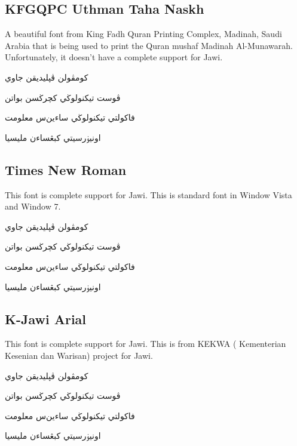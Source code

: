 \documentclass[12pt,a4paper]{IEEEconf}
\begin{document}
\subsection{KFGQPC Uthman Taha Naskh}

A beautiful font from King Fadh Quran Printing Complex, Madinah, Saudi Arabia that is being used to print the Quran mushaf Madinah Al-Munawarah. Unfortunately, it doesn't have a complete support for Jawi.

\newfontfamily{}
\begin{arab}
\begin{center}
کومڤولن ڤڽليديقن جاوي
\par  
ڤوست تيكنولوڬي کچرڬسن بواتن
\par  
فاکولتي تيكنولوڬي ساءين‌س معلومت
\par  
اونيۏرسيتي کبڠساءن مليسيا
\par  
\end{center}
\end{arab}

\subsection{Times New Roman}
This font is complete support for Jawi. This is standard font in Window Vista and Window 7.
\newfontfamily{}

\begin{arab}
\begin{center}
کومڤولن ڤڽليديقن جاوي
\par  
ڤوست تيكنولوڬي کچرڬسن بواتن
\par  
فاکولتي تيكنولوڬي ساءين‌س معلومت
\par  
اونيۏرسيتي کبڠساءن مليسيا
\par  
\end{center}
\end{arab}

\subsection{K-Jawi Arial}
This font is complete support for Jawi. This is from KEKWA ( Kementerian Kesenian dan Warisan) project for Jawi.

\newfontfamily{}

\begin{arab}
\begin{center}
کومڤولن ڤڽليديقن جاوي
\par  
ڤوست تيكنولوڬي کچرڬسن بواتن
\par  
فاکولتي تيكنولوڬي ساءين‌س معلومت
\par  
اونيۏرسيتي کبڠساءن مليسيا
\par  
\end{center}
\end{arab}
\end{document}
